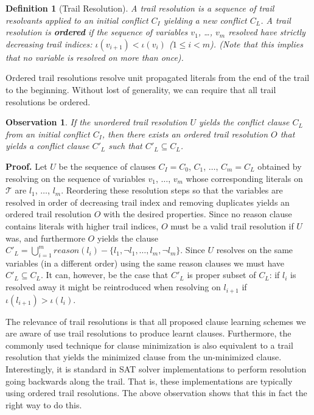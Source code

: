 \documentclass[runningheads]{llncs}
\newcommand{\sat}{SAT\xspace}
\newcommand{\trail}{\ensuremath{\mathcal{T}}}
\newcommand{\trailIdx}[1]{\ensuremath{\iota(#1)}}
\newcommand{\reason}[1]{\ensuremath{\mathit{reason}(#1)}}
\newtheorem{Obs}{Observation}
\newtheorem{defn}{Definition}
\newcommand{\whitebox}{\raisebox{.5ex}{\fbox{\hspace*{.2ex}}}}
\begin{document}
\begin{defn}[Trail Resolution]
    A trail resolution is a sequence of trail resolvants applied to an
    initial conflict $C_I$ yielding a new conflict $C_L$.  A trail
    resolution is \textbf{ordered} if the sequence of variables $v_1$,
    \dots, $v_m$ resolved have strictly decreasing trail indices:
    $\trailIdx{v_{i+1}} < \trailIdx{v_i}$ ($1\leq i < m$). (Note that
    this implies that no variable is resolved on more than once).
\end{defn}

Ordered trail resolutions resolve unit propagated literals from the
end of the trail to the beginning. Without lost of generality, we can
require that all trail resolutions be ordered.

\begin{Obs}
    If the unordered trail resolution $U$ yields the conflict clause
    $C_L$ from an initial conflict $C_I$, then there exists an ordered
    trail resolution $O$ that yields a conflict clause $C'_L$ such
    that $C'_L\subseteq C_L$.
\end{Obs}
\noindent
\textbf{Proof.} Let $U$ be the sequence of clauses $C_I = C_0$, $C_1$,
$\ldots$, $C_m= C_L$ obtained by resolving on the sequence of
variables $v_1$, $\ldots$, $v_m$ whose corresponding literals on
$\trail$ are $l_1$, $\ldots$, $l_m$. Reordering these resolution steps
so that the variables are resolved in order of decreasing trail index
and removing duplicates yields an ordered trail resolution $O$ with
the desired properties. Since no reason clause contains literals with
higher trail indices, $O$ must be a valid trail resolution if $U$
was, and furthermore $O$ yields the clause
$C'_L = \bigcup_{i=1}^m \reason{l_i} - \{l_1, \lnot l_1, \ldots, l_m,
\lnot l_m\}$. Since $U$ resolves on the same variables (in a different
order) using the same reason clauses we must have $C'_L\subseteq
C_L$. It can, however, be the case that $C'_L$ is proper subset of
$C_L$: if $l_i$ is resolved away it might be reintroduced when
resolving on $l_{i+1}$ if $\trailIdx{l_{i+1}}  > \trailIdx{l_i}$.
\whitebox

The relevance of trail resolutions is that all proposed clause
learning schemes we are aware of use trail resolutions to produce
learnt clauses. Furthermore, the commonly used technique for clause
minimization \cite{DBLP:conf/sat/SorenssonB09} is also equivalent to a
trail resolution that yields the minimized clause from the
un-minimized clause. Interestingly, it is standard in \sat solver
implementations to perform resolution going backwards along the
trail. That is, these implementations are typically using ordered
trail resolutions. The above observation shows that this in fact the
right way to do this.
\end{document}
